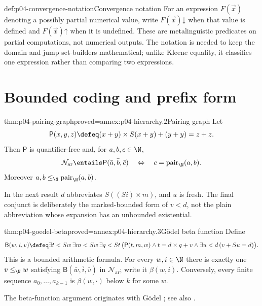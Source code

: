 \begin{hbconvention}{def:p04-convergence-notation}{Convergence notation}
For an expression \(F(\vec x)\) denoting a possibly partial numerical value,
write \(F(\vec x)\mathord\downarrow\) when that value is defined and
\(F(\vec x)\mathord\uparrow\) when it is undefined.  These are
metalinguistic predicates on partial computations, not numerical outputs.
The notation is needed to keep the domain and jump set-builders mathematical;
unlike Kleene equality, it classifies one expression rather than comparing
two expressions.
\end{hbconvention}

\section{Bounded coding and prefix form}
\label{sec:p04-bounded-coding}

\begin{hblemma}{thm:p04-pairing-graph}{proved=annex:p04-hierarchy.2}{Pairing graph}
Let
\[
 \mathsf P(x,y,z)\defeq(x+y)\times S(x+y)+(y+y)=z+z.
\]
Then \(\mathsf P\) is quantifier-free and, for \(a,b,c\in\N\),
\[
 \mathcal N_{\mathrm{ar}}\entails\mathsf P(\bar a,\bar b,\bar c)
 \quad\Leftrightarrow\quad
 c=\operatorname{pair}_{\N}(a,b).
\]
Moreover \(a,b\leq_{\N}\operatorname{pair}_{\N}(a,b)\).
\end{hblemma}

In the next result \(d\) abbreviates \(S((Si)\times m)\), and \(u\) is
fresh.  The final conjunct is deliberately the marked-bounded form of
\(v<d\), not the plain abbreviation whose expansion has an unbounded
existential.

\begin{hblemma}{thm:p04-goedel-beta}{proved=annex:p04-hierarchy.3}{G\"odel beta function}
Define
\[
 \mathsf B(w,i,v)\defeq
 \exists t<Sw\,\exists m<Sw\,\exists q<St\,
 \bigl(\mathsf P(t,m,w)\land t=d\times q+v\land
       \exists u<d\,(v+Su=d)\bigr).
\]
This is a bounded arithmetic formula.  For every \(w,i\in\N\) there is
exactly one \(v\leq_{\N} w\) satisfying \(\mathsf B(\bar w,\bar i,\bar v)\) in
\(\mathcal N_{\mathrm{ar}}\); write it \(\beta(w,i)\).  Conversely, every finite sequence
\(a_0,\ldots,a_{k-1}\) is \(\beta(w,\cdot)\) below \(k\) for some \(w\).
\end{hblemma}

The beta-function argument originates with G\"odel \cite{Godel1931}; see
also \cite[ch.~16]{BoolosBurgessJeffrey2007}.

